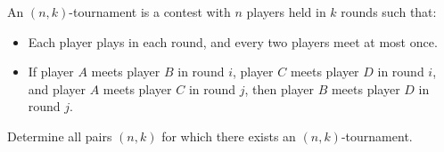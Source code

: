 An $(n, k)$-tournament is a contest with $n$ players held in $k$ rounds such that:
\begin{itemize}
\item[(i)] Each player plays in each round, and every two players meet at most once.
\item[(ii)] If player $A$ meets player $B$ in round $i$, player $C$ meets player $D$ in round $i$, and player $A$ meets player $C$ in round $j$, then player $B$ meets player $D$ in round $j$.
\end{itemize}
Determine all pairs $(n, k)$ for which there exists an $(n, k)$-tournament.
